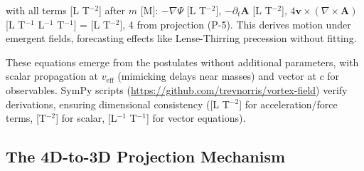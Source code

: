 with all terms [L T$^{-2}$] after $m$ [M]: $-\nabla \Psi$ [L T$^{-2}$], $-\partial_t \mathbf{A}$ [L T$^{-2}$], $4 \mathbf{v} \times (\nabla \times \mathbf{A})$ [L T$^{-1}$ L$^{-1}$ T$^{-1}$] = [L T$^{-2}$], 4 from projection (P-5). This derives motion under emergent fields, forecasting effects like Lense-Thirring precession without fitting.

These equations emerge from the postulates without additional parameters, with scalar propagation at $v_{\text{eff}}$ (mimicking delays near masses) and vector at $c$ for observables. SymPy scripts (\url{https://github.com/trevnorris/vortex-field}) verify derivations, ensuring dimensional consistency ([L T$^{-2}$] for acceleration/force terms, [T$^{-2}$] for scalar, [L$^{-1}$ T$^{-1}$] for vector equations).

\medskip
\noindent
{}
\medskip

\subsection{The 4D-to-3D Projection Mechanism}
\label{sec:projection}

